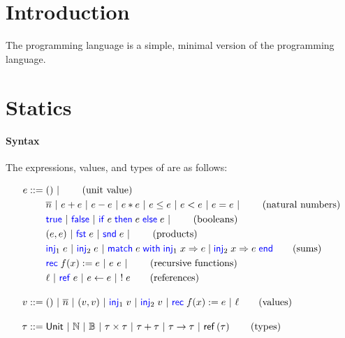 \documentclass[10pt]{scrartcl}
\begin{document}

\author{Amin TImany}
\title{\miniML{}}

\maketitle

\section{Introduction}
\label{sec:intro}
The programming language \miniML{} is a simple, minimal version of the \ML{} programming language.

\section{Statics}
\label{sec:statics}

\paragraph{Syntax}
The expressions, values, and types of \miniML{} are as follows:

\begin{align*}
  \expr \BNFdef{}
  & \TT \ALT \tag{unit value} \\
  & \Num{n} \ALT \expr + \expr \ALT \expr - \expr \ALT \expr * \expr \ALT \expr \le \expr \ALT \expr < \expr \ALT \expr = \expr \ALT \tag{natural numbers}\\
  & \True \ALT \False \ALT \If \expr then \expr\; \Else \expr \ALT \tag{booleans} \\
  & (\expr, \expr) \ALT \Fst \expr \ALT \Snd \expr \ALT \tag{products} \\
  & \Inj{1} \expr \ALT \Inj{2} \expr \ALT \Match \expr with \Inj{1} \var => \expr | \Inj{2} \var => \expr end \tag{sums}\\
  & \Rec f \var := \expr \ALT \expr~\expr \ALT \tag{recursive functions}\\
  & \loc \ALT \alloc \expr \ALT \expr \gets \expr \ALT \deref \expr \tag{references}\\[1em]
  \val \BNFdef{}
  & \TT \ALT \Num{n} \ALT (\val, \val) \ALT \Inj{1} \val \ALT \Inj{2} \val \ALT \Rec f \var := \expr \ALT \loc \tag{values}\\[1em]
  \typ \BNFdef{}
  & \Tunit \ALT \Tnat \ALT \Tbool \ALT \typ \times \typ \ALT \typ + \typ \ALT \typ \to \typ \ALT \Tref{\typ} \tag{types}
\end{align*}
\end{document}

